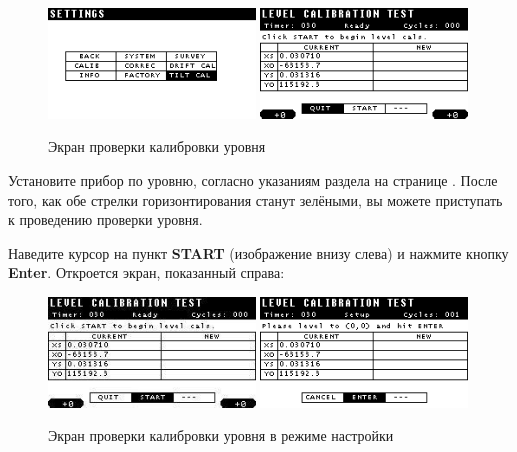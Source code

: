 \begin{figure}[H]
  \centering
  \includegraphics[width=0.49\textwidth]{figures/the_level_calibration_test_screen_1}
  \includegraphics[width=0.49\textwidth]{figures/the_level_calibration_test_screen_2}
  \caption{Экран проверки калибровки уровня}
  \label{fig:the_level_calibration_test_screen}
\end{figure}

Установите прибор \cg{} по уровню, согласно указаниям раздела
 на странице
\pageref{subsec:leveling_the_cg6_autograv}. После того, как обе стрелки
горизонтирования станут зелёными, вы можете приступать к проведению проверки
уровня.

Наведите курсор на пункт \textbf{START} (изображение внизу слева) и нажмите кнопку
\textbf{Enter}. Откроется экран, показанный справа:

\begin{figure}[H]
  \centering
  \includegraphics[width=0.49\textwidth]{figures/the_level_calibration_test_screen_in_setup_mode_1}
  \includegraphics[width=0.49\textwidth]{figures/the_level_calibration_test_screen_in_setup_mode_2}
  \caption{Экран проверки калибровки уровня в режиме настройки}
  \label{fig:the_level_calibration_test_screen_in_setup_mode}
\end{figure}

